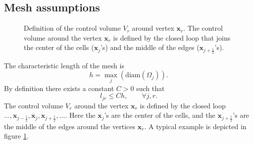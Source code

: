 \documentclass[a4paper,french,english,10pt]{article}
\begin{document}
\subsection{Mesh assumptions}


 \begin{figure}[h!]
 \begin{center}
 \end{center}
 \caption{Definition of the control volume $V_r$ around
 vertex $\mathbf{x}_r$.
 The control volume  around the vertex $\mathbf{x}_r$
 is defined by the closed loop
 that joins the center of the cells ($\mathbf{x}_j$'s) and the middle
 of the edges ($\mathbf{x}_{j+\frac12}$'s).}
 \label{figcv}
 \end{figure}


The characteristic length of the mesh is 
\begin{equation*} \label{eq:d6}
h=\max_j \left( \mbox{diam}(\Omega_j)  \right).
\end{equation*}
By definition  there exists  a constant $C>0$ such that 
\begin{equation} \label{eq:d7}
l_{jr}\leq Ch , \qquad \forall j,r.
\end{equation}
The control volume $V_r$ 
around the vertex $\mathbf x_r$ is 
defined by the closed loop
$
\dots, \mathbf{x}_{j-\frac12}, \mathbf{x}_j,\mathbf{x}_{j+\frac12},\dots$.
Here  the $\mathbf{x}_j$'s are the center of the cells, and the 
$\mathbf{x}_{j+\frac12}$'s are the middle of the edges around the vertices
$\mathbf{x}_r$.
A typical example is depicted in  figure \ref{figcv}. 
\end{document}
